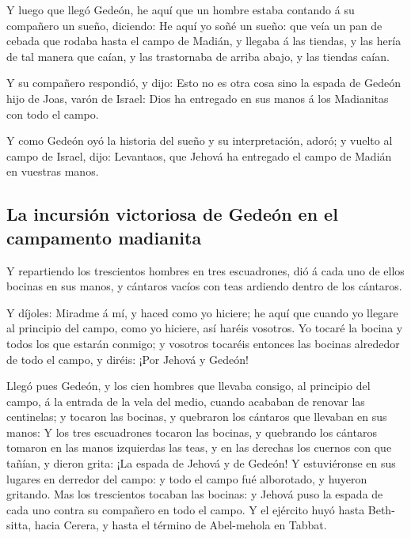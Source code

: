 Y luego que llegó Gedeón, he aquí que un hombre estaba
contando á su compañero un sueño, diciendo: He aquí yo soñé un sueño:
que veía un pan de cebada que rodaba hasta el campo de Madián, y llegaba
á las tiendas, y las hería de tal manera que caían, y las trastornaba de
arriba abajo, y las tiendas caían.

 Y su compañero respondió, y dijo: Esto no es otra cosa
sino la espada de Gedeón hijo de Joas, varón de Israel: Dios ha
entregado en sus manos á los Madianitas con todo el campo.

 Y como Gedeón oyó la historia del sueño y su
interpretación, adoró; y vuelto al campo de Israel, dijo: Levantaos, que
Jehová ha entregado el campo de Madián en vuestras manos.

\hypertarget{la-incursiuxf3n-victoriosa-de-gedeuxf3n-en-el-campamento-madianita}{%
\subsection{La incursión victoriosa de Gedeón en el campamento
madianita}\label{la-incursiuxf3n-victoriosa-de-gedeuxf3n-en-el-campamento-madianita}}

 Y repartiendo los trescientos hombres en tres
escuadrones, dió á cada uno de ellos bocinas en sus manos, y cántaros
vacíos con teas ardiendo dentro de los cántaros.

 Y díjoles: Miradme á mí, y haced como yo hiciere; he
aquí que cuando yo llegare al principio del campo, como yo hiciere, así
haréis vosotros.  Yo tocaré la bocina y todos los que
estarán conmigo; y vosotros tocaréis entonces las bocinas alrededor de
todo el campo, y diréis: ¡Por Jehová y Gedeón!

 Llegó pues Gedeón, y los cien hombres que llevaba
consigo, al principio del campo, á la entrada de la vela del medio,
cuando acababan de renovar las centinelas; y tocaron las bocinas, y
quebraron los cántaros que llevaban en sus manos:  Y los
tres escuadrones tocaron las bocinas, y quebrando los cántaros tomaron
en las manos izquierdas las teas, y en las derechas los cuernos con que
tañían, y dieron grita: ¡La espada de Jehová y de Gedeón!
 Y estuviéronse en sus lugares en derredor del campo: y
todo el campo fué alborotado, y huyeron gritando.  Mas
los trescientos tocaban las bocinas: y Jehová puso la espada de cada uno
contra su compañero en todo el campo. Y el ejército huyó hasta
Beth-sitta, hacia Cerera, y hasta el término de Abel-mehola en Tabbat.

